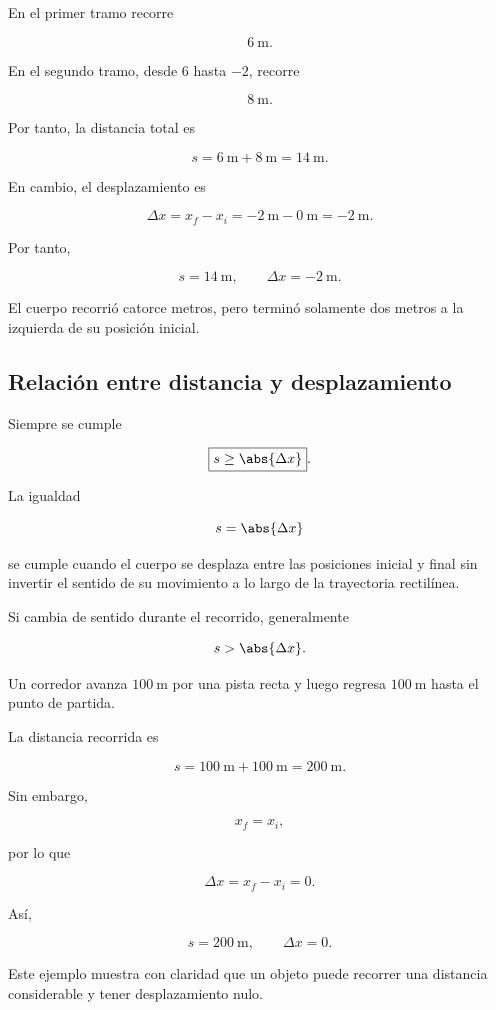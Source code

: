 En el primer tramo recorre

\[ \SI{6}{\meter}. \]

En el segundo tramo, desde \(6\) hasta \(-2\), recorre

\[ \SI{8}{\meter}. \]

Por tanto, la distancia total es

\[
s=\SI{6}{\meter}+\SI{8}{\meter}
=\SI{14}{\meter}.
\]

En cambio, el desplazamiento es

\[
\Delta x=x_f-x_i
=-\SI{2}{\meter}-\SI{0}{\meter}
=-\SI{2}{\meter}.
\]

Por tanto,

\[
\boxed{s=\SI{14}{\meter}},
\qquad
\boxed{\Delta x=-\SI{2}{\meter}}.
\]

El cuerpo recorrió catorce metros, pero terminó solamente dos metros a la
izquierda de su posición inicial.


\subsection{Relación entre distancia y desplazamiento}

Siempre se cumple

\[ \boxed{s\geq\abs{\Delta x}}. \]

La igualdad

\[ s=\abs{\Delta x} \]

se cumple cuando el cuerpo se desplaza entre las posiciones inicial y final
sin invertir el sentido de su movimiento a lo largo de la trayectoria
rectilínea.

Si cambia de sentido durante el recorrido, generalmente

\[ s>\abs{\Delta x}. \]

\begin{ejemplo}
Un corredor avanza \(\SI{100}{\meter}\) por una pista recta y luego regresa
\(\SI{100}{\meter}\) hasta el punto de partida.

La distancia recorrida es

\[
s=\SI{100}{\meter}+\SI{100}{\meter}
=\SI{200}{\meter}.
\]

Sin embargo,

\[ x_f=x_i, \]

por lo que

\[
\Delta x=x_f-x_i=0.
\]

Así,

\[ \boxed{s=\SI{200}{\meter}}, \qquad \boxed{\Delta x=0}. \]

Este ejemplo muestra con claridad que un objeto puede recorrer una distancia
considerable y tener desplazamiento nulo.
\end{ejemplo}


